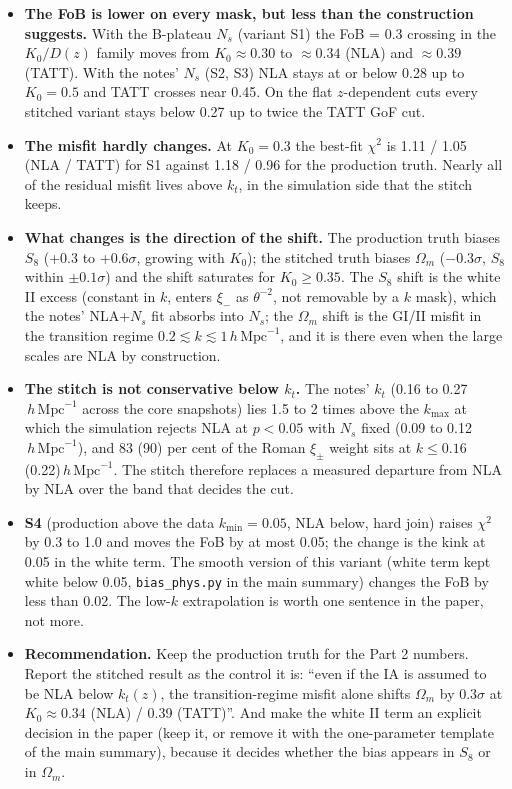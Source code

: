 \documentclass[11pt]{article}
\newcommand{\hmpc}{\,h\,\mathrm{Mpc}^{-1}}
\begin{document}
\begin{itemize}
\item \textbf{The FoB is lower on every mask, but less than the construction
  suggests.} With the B-plateau $N_s$ (variant S1) the FoB = 0.3 crossing
  in the $K_0/D(z)$ family moves from $K_0 \approx 0.30$ to $\approx 0.34$
  (NLA) and $\approx 0.39$ (TATT). With the notes' $N_s$ (S2, S3) NLA stays
  at or below 0.28 up to $K_0 = 0.5$ and TATT crosses near 0.45. On the flat
  $z$-dependent cuts every stitched variant stays below 0.27 up to twice the
  TATT GoF cut.
\item \textbf{The misfit hardly changes.} At $K_0 = 0.3$ the best-fit
  $\chi^2$ is 1.11 / 1.05 (NLA / TATT) for S1 against 1.18 / 0.96 for the
  production truth. Nearly all of the residual misfit lives above $k_t$,
  in the simulation side that the stitch keeps.
\item \textbf{What changes is the direction of the shift.} The production
  truth biases $S_8$ (+0.3 to +0.6$\sigma$, growing with $K_0$); the stitched
  truth biases $\Omega_m$ ($-0.3\sigma$, $S_8$ within $\pm 0.1\sigma$) and the
  shift saturates for $K_0 \ge 0.35$. The $S_8$ shift is the white II excess
  (constant in $k$, enters $\xi_-$ as $\theta^{-2}$, not removable by a $k$
  mask), which the notes' NLA+$N_s$ fit absorbs into $N_s$; the $\Omega_m$
  shift is the GI/II misfit in the transition regime $0.2 \lesssim k
  \lesssim 1\hmpc$, and it is there even when the large scales are NLA by
  construction.
\item \textbf{The stitch is not conservative below $k_t$.} The notes'
  $k_t$ (0.16 to 0.27$\hmpc$ across the core snapshots) lies 1.5 to 2 times
  above the $k_{\max}$ at which the simulation rejects NLA at $p<0.05$ with
  $N_s$ fixed (0.09 to 0.12$\hmpc$), and 83 (90) per cent of the Roman
  $\xi_\pm$ weight sits at $k \le 0.16$ (0.22)$\hmpc$. The stitch therefore
  replaces a measured departure from NLA by NLA over the band that decides
  the cut.
\item \textbf{S4} (production above the data $k_{\min} = 0.05$, NLA below,
  hard join) raises $\chi^2$ by 0.3 to 1.0 and moves the FoB by at most
  0.05; the change is the kink at 0.05 in the white term. The smooth
  version of this variant (white term kept white below 0.05,
  \texttt{bias\_phys.py} in the main summary) changes the FoB by less than
  0.02. The low-$k$ extrapolation is worth one sentence in the paper, not
  more.
\item \textbf{Recommendation.} Keep the production truth for the Part 2
  numbers. Report the stitched result as the control it is: ``even if the
  IA is assumed to be NLA below $k_t(z)$, the transition-regime misfit
  alone shifts $\Omega_m$ by $0.3\sigma$ at $K_0 \approx 0.34$ (NLA) /
  0.39 (TATT)''. And make the white II term an explicit decision in the
  paper (keep it, or remove it with the one-parameter template of the
  main summary), because it decides whether the bias appears in $S_8$ or
  in $\Omega_m$.
\end{itemize}
\end{document}
